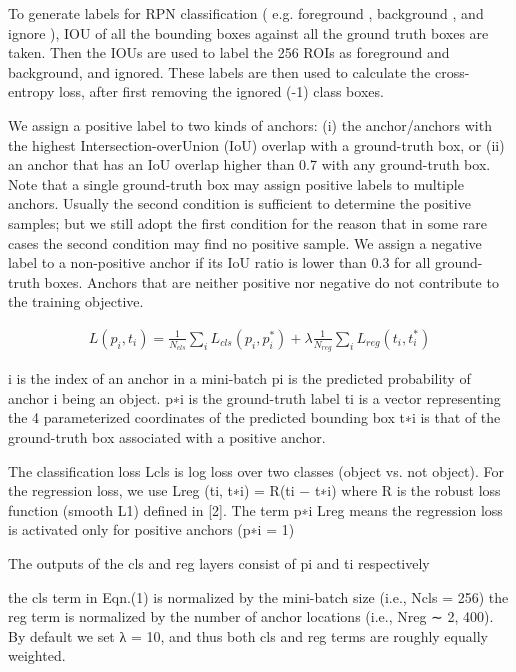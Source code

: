 \documentclass{article}
\begin{document}
To generate labels for RPN classification ( e.g. foreground , background , and ignore ), IOU of all the bounding boxes against all the ground truth boxes are taken. 
Then the IOUs are used to label the 256 ROIs as foreground and background, and ignored. 
These labels are then used to calculate the cross-entropy loss, after first removing the ignored (-1) class boxes.

We assign a positive label to two kinds of anchors: (i) the
anchor/anchors with the highest Intersection-overUnion (IoU) overlap with a ground-truth box, or (ii) an
anchor that has an IoU overlap higher than 0.7 with
any ground-truth box. Note that a single ground-truth
box may assign positive labels to multiple anchors.
Usually the second condition is sufficient to determine
the positive samples; but we still adopt the first
condition for the reason that in some rare cases the
second condition may find no positive sample. We
assign a negative label to a non-positive anchor if its
IoU ratio is lower than 0.3 for all ground-truth boxes.
Anchors that are neither positive nor negative do not
contribute to the training objective.

\begin{align*}
    L({p_i},{t_i}) = \frac{1}{N_{cls}} \sum_i L_{cls}(p_i,p_i^*) + \lambda \frac{1}{N_{reg}} \sum_i L_{reg}(t_i,t_i^*)
\end{align*}

i is the index of an anchor in a mini-batch 
pi is the predicted probability of anchor i being an object. 
p∗i is the ground-truth label 
ti is a vector representing the 4 parameterized coordinates of the predicted bounding box
t∗i is that of the ground-truth box associated with a positive anchor.

The classification loss Lcls is log loss over two classes (object vs. not object). 
For the regression loss, we use Lreg (ti, t∗i) = R(ti − t∗i) where R is the robust loss function (smooth L1) defined in [2]. 
The term p∗i Lreg means the regression loss is activated only for positive anchors (p∗i = 1) 

The outputs of the cls and reg layers consist of {pi} and {ti} respectively

the cls term in Eqn.(1) is normalized by the mini-batch size (i.e., Ncls = 256) 
the reg term is normalized by the number of anchor locations (i.e., Nreg ∼ 2, 400).
By default we set λ = 10, and thus both cls and reg terms are roughly equally weighted. 
\end{document}
